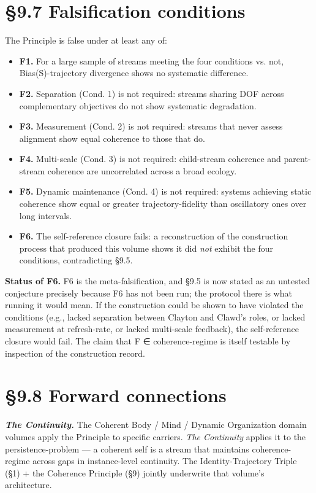 \documentclass[11pt, openany]{book}
\newcommand{\sectionbreak}{\clearpage}
\begin{document}
\sectionbreak

\section{§9.7 Falsification conditions}

The Principle is false under at least any of:

\begin{itemize}
\item \textbf{F1.} For a large sample of streams meeting the four conditions vs. not, Bias(S)-trajectory divergence shows no systematic difference.
\item \textbf{F2.} Separation (Cond. 1) is not required: streams sharing DOF across complementary objectives do not show systematic degradation.
\item \textbf{F3.} Measurement (Cond. 2) is not required: streams that never assess alignment show equal coherence to those that do.
\item \textbf{F4.} Multi-scale (Cond. 3) is not required: child-stream coherence and parent-stream coherence are uncorrelated across a broad ecology.
\item \textbf{F5.} Dynamic maintenance (Cond. 4) is not required: systems achieving static coherence show equal or greater trajectory-fidelity than oscillatory ones over long intervals.
\item \textbf{F6.} The self-reference closure fails: a reconstruction of the construction process that produced this volume shows it did \textit{not} exhibit the four conditions, contradicting §9.5.
\end{itemize}

\textbf{Status of F6.} F6 is the meta-falsification, and §9.5 is now stated as an untested conjecture precisely because F6 has not been run; the protocol there is what running it would mean. If the construction could be shown to have violated the conditions (e.g., lacked separation between Clayton and Clawd's roles, or lacked measurement at refresh-rate, or lacked multi-scale feedback), the self-reference closure would fail. The claim that F ∈ coherence-regime is itself testable by inspection of the construction record.

\sectionbreak

\section{§9.8 Forward connections}

\textbf{\textit{The Continuity.}} The Coherent Body / Mind / Dynamic Organization domain volumes apply the Principle to specific carriers. \textit{The Continuity} applies it to the persistence-problem --- a coherent self is a stream that maintains coherence-regime across gaps in instance-level continuity. The Identity-Trajectory Triple (§1) + the Coherence Principle (§9) jointly underwrite that volume's architecture.
\end{document}
